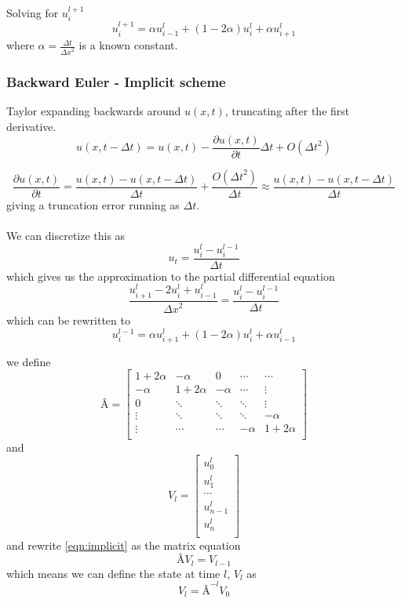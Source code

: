 \documentclass[10pt,a4paper]{article}
\newcommand{\dt}{{\Delta t}}
\newcommand{\dx}{{\Delta x}}
\newcommand{\pt}{{\partial t}}
\newcommand{\pu}{{\partial u}}
\begin{document}
Solving for $u_i^{l+1}$
\begin{equation}
u_i^{l+1} = \alpha u_{i-1}^l + (1-2\alpha)u_i^l + \alpha u_{i+1}^l
\end{equation}
where $\alpha = \frac{\dt}{\dx^2}$ is a known constant.


\subsubsection{Backward Euler - Implicit scheme}
Taylor expanding backwards around $u(x,t)$, truncating after the first derivative.
\begin{equation}
u(x,t-\dt) = u(x,t) - \frac{\pu(x,t)}{\pt}\dt + O(\dt^2)
\end{equation}

\begin{equation}
\frac{\pu(x,t)}{\pt} = \frac{u(x,t) - u(x,t-\dt)}{\dt} + \frac{O(\dt^2)}{\dt} \approx \frac{u(x,t) - u(x,t-\dt)}{\dt}
\end{equation}
giving a truncation error running as $\dt$.
\\\\
We can discretize this as
\begin{equation}
u_t = \frac{u_i^l - u_i^{l-1}}{\dt}
\end{equation}
which gives us the approximation to the partial differential equation
\begin{equation}
\frac{u_{i+1}^l - 2u_i^l+u_{i-1}^l}{\dx^2} = \frac{u_i^l - u_i^{l-1}}{\dt}
\end{equation}
which can be rewritten to
\begin{equation}\label{eqn:implicit}
u_i^{l-1} = \alpha u_{i+1}^l + (1 - 2\alpha )u_i^l + \alpha u_{i-1}^l
\end{equation}

we define
\[
Â = \begin{bmatrix}
1+2\alpha & -\alpha & 0 & \cdots & \cdots \\
-\alpha & 1+2\alpha & -\alpha & \cdots & \vdots \\
0 & \ddots & \ddots & \ddots & \vdots \\
\vdots & \ddots & \ddots & \ddots & -\alpha \\
\vdots & \cdots & \cdots & -\alpha & 1+2\alpha \\
\end{bmatrix}
\]
and
\[ V_l = \begin{bmatrix}
u_{0}^l\\
u_{1}^l\\
\cdots\\
u_{n-1}^l\\
u_{n}^l\\
\end{bmatrix}
\]
and rewrite \ref{eqn:implicit} as the matrix equation
\begin{equation}
ÂV_l = V_{l-1}
\end{equation}
which means we can define the state at time $l$, $V_l$ as
\begin{equation}
V_l = Â^{-l}V_0
\end{equation}
\end{document}

